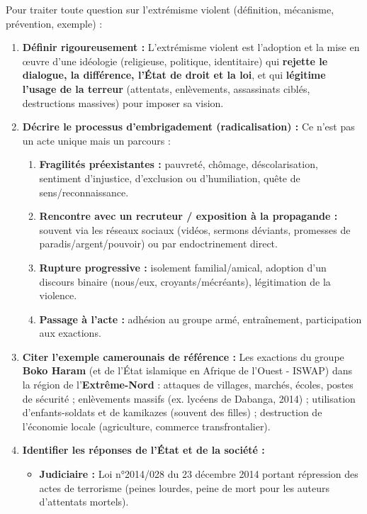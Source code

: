 \documentclass[11pt]{article}
\newcommand{\cle}[1]{{\popxbold\color{popdark}#1}}
\begin{document}
\begin{methode}
Pour traiter toute question sur l'extrémisme violent (définition, mécanisme, prévention, exemple) :
\begin{enumerate}
\item \textbf{Définir rigoureusement :} L'\cle{extrémisme violent} est l'adoption et la mise en œuvre d'une idéologie (religieuse, politique, identitaire) qui \textbf{rejette le dialogue, la différence, l'État de droit et la loi}, et qui \textbf{légitime l'usage de la terreur} (attentats, enlèvements, assassinats ciblés, destructions massives) pour imposer sa vision.
\item \textbf{Décrire le processus d'embrigadement (radicalisation) :} Ce n'est pas un acte unique mais un parcours :
\begin{enumerate}
\item \textbf{Fragilités préexistantes :} pauvreté, chômage, déscolarisation, sentiment d'injustice, d'exclusion ou d'humiliation, quête de sens/reconnaissance.
\item \textbf{Rencontre avec un recruteur / exposition à la propagande :} souvent via les réseaux sociaux (vidéos, sermons déviants, promesses de paradis/argent/pouvoir) ou par endoctrinement direct.
\item \textbf{Rupture progressive :} isolement familial/amical, adoption d'un discours binaire (nous/eux, croyants/mécréants), légitimation de la violence.
\item \textbf{Passage à l'acte :} adhésion au groupe armé, entraînement, participation aux exactions.
\end{enumerate}
\item \textbf{Citer l'exemple camerounais de référence :} Les exactions du groupe \textbf{Boko Haram} (et de l'État islamique en Afrique de l'Ouest - ISWAP) dans la région de l'\textbf{Extrême-Nord} : attaques de villages, marchés, écoles, postes de sécurité ; enlèvements massifs (ex. lycéens de Dabanga, 2014) ; utilisation d'enfants-soldats et de kamikazes (souvent des filles) ; destruction de l'économie locale (agriculture, commerce transfrontalier).
\item \textbf{Identifier les réponses de l'État et de la société :}
\begin{itemize}
\item \textbf{Judiciaire :} Loi n°2014/028 du 23 décembre 2014 portant répression des actes de terrorisme (peines lourdes, peine de mort pour les auteurs d'attentats mortels).

\end{itemize}
\end{enumerate}
\end{methode}
\end{document}
